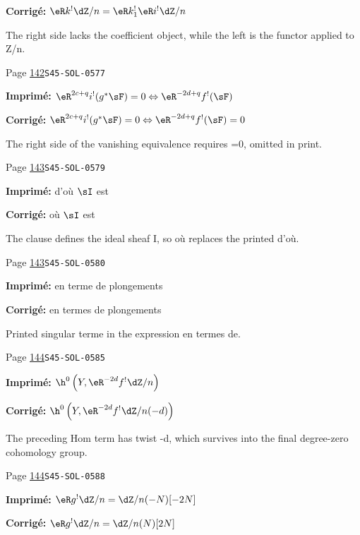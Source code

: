 \begin{description}
\par\noindent\textbf{Corrigé:} \(\eR k^! \dZ/n=\eR k_1^! \eR i^!\dZ/n\)
\par\noindent The right side lacks the coefficient object, while the left is the functor applied to Z/n.
\smallskip
\item[\hypertarget{apparatus:FR-0097}{97}] Page \hyperlink{printpage:fr:142}{142}\quad\texttt{S45-SOL-0577}
\par\noindent\textbf{Imprimé:} \(\eR^{2 c+q} i^!(g^*\sF)=0\Leftrightarrow \eR^{-2 d+q}f^!(\sF)\)
\par\noindent\textbf{Corrigé:} \(\eR^{2 c+q} i^!(g^*\sF)=0\Leftrightarrow \eR^{-2 d+q}f^!(\sF)=0\)
\par\noindent The right side of the vanishing equivalence requires =0, omitted in print.
\smallskip
\item[\hypertarget{apparatus:FR-0098}{98}] Page \hyperlink{printpage:fr:143}{143}\quad\texttt{S45-SOL-0579}
\par\noindent\textbf{Imprimé:} d'où $\sI$ est
\par\noindent\textbf{Corrigé:} où $\sI$ est
\par\noindent The clause defines the ideal sheaf I, so où replaces the printed d’où.
\smallskip
\item[\hypertarget{apparatus:FR-0099}{99}] Page \hyperlink{printpage:fr:143}{143}\quad\texttt{S45-SOL-0580}
\par\noindent\textbf{Imprimé:} en terme de plongements
\par\noindent\textbf{Corrigé:} en termes de plongements
\par\noindent Printed singular terme in the expression en termes de.
\smallskip
\item[\hypertarget{apparatus:FR-0100}{100}] Page \hyperlink{printpage:fr:144}{144}\quad\texttt{S45-SOL-0585}
\par\noindent\textbf{Imprimé:} \(\h^0\left(Y,\eR^{-2 d}f^!\dZ/n\right)\)
\par\noindent\textbf{Corrigé:} \(\h^0\left(Y,\eR^{-2 d}f^!\dZ/n(-d)\right)\)
\par\noindent The preceding Hom term has twist -d, which survives into the final degree-zero cohomology group.
\smallskip
\item[\hypertarget{apparatus:FR-0101}{101}] Page \hyperlink{printpage:fr:144}{144}\quad\texttt{S45-SOL-0588}
\par\noindent\textbf{Imprimé:} \(\eR g^! \dZ/n=\dZ/n(-N)[-2 N]\)
\par\noindent\textbf{Corrigé:} \(\eR g^! \dZ/n=\dZ/n(N)[2 N]\)

\end{description}
